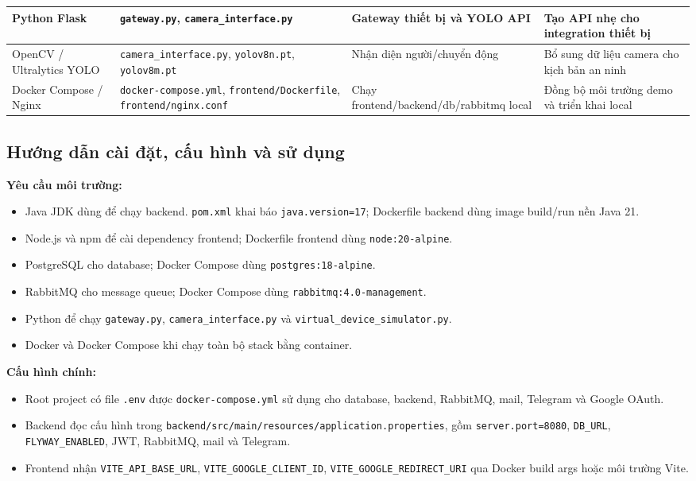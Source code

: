 {\begin{longtable}{|p{}|p{}|p{}|p{}|}
\hline
Python Flask & \texttt{gateway.py}, \texttt{camera\_interface.py} & Gateway thiết bị và YOLO API & Tạo API nhẹ cho integration thiết bị \\
\hline
OpenCV / Ultralytics YOLO & \texttt{camera\_interface.py}, \texttt{yolov8n.pt}, \texttt{yolov8m.pt} & Nhận diện người/chuyển động & Bổ sung dữ liệu camera cho kịch bản an ninh \\
\hline
Docker Compose / Nginx & \texttt{docker-compose.yml}, \texttt{frontend/Dockerfile}, \texttt{frontend/nginx.conf} & Chạy frontend/backend/db/rabbitmq local & Đồng bộ môi trường demo và triển khai local \\
\hline
\end{longtable}
}

\subsection{Hướng dẫn cài đặt, cấu hình và sử dụng}

\textbf{Yêu cầu môi trường:}
\begin{itemize}
    \item Java JDK dùng để chạy backend. \texttt{pom.xml} khai báo \texttt{java.version=17}; Dockerfile backend dùng image build/run nền Java 21.
    \item Node.js và npm để cài dependency frontend; Dockerfile frontend dùng \texttt{node:20-alpine}.
    \item PostgreSQL cho database; Docker Compose dùng \texttt{postgres:18-alpine}.
    \item RabbitMQ cho message queue; Docker Compose dùng \texttt{rabbitmq:4.0-management}.
    \item Python để chạy \texttt{gateway.py}, \texttt{camera\_interface.py} và \texttt{virtual\_device\_simulator.py}.
    \item Docker và Docker Compose khi chạy toàn bộ stack bằng container.
\end{itemize}

\textbf{Cấu hình chính:}
\begin{itemize}
    \item Root project có file \texttt{.env} được \texttt{docker-compose.yml} sử dụng cho database, backend, RabbitMQ, mail, Telegram và Google OAuth.
    \item Backend đọc cấu hình trong \texttt{backend/src/main/resources/application.properties}, gồm \texttt{server.port=8080}, \texttt{DB\_URL}, \texttt{FLYWAY\_ENABLED}, JWT, RabbitMQ, mail và Telegram.
    \item Frontend nhận \texttt{VITE\_API\_BASE\_URL}, \texttt{VITE\_GOOGLE\_CLIENT\_ID}, \texttt{VITE\_GOOGLE\_REDIRECT\_URI} qua Docker build args hoặc môi trường Vite.
\end{itemize}

